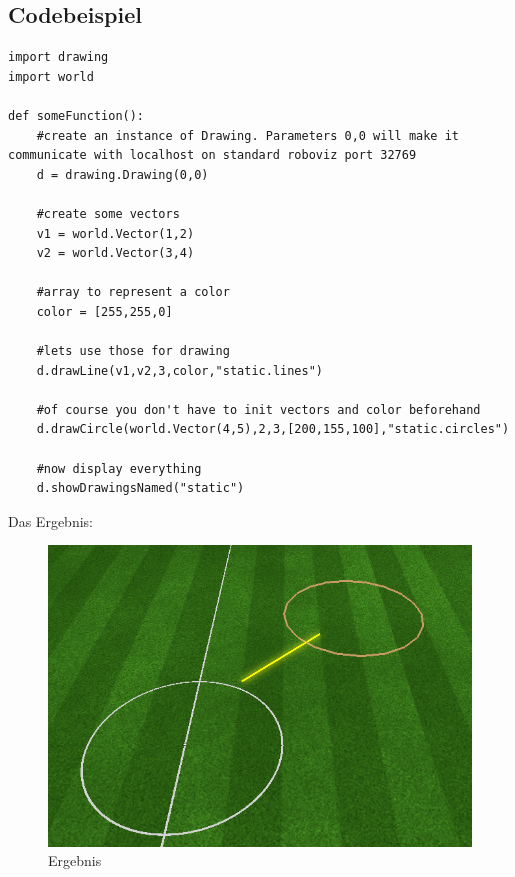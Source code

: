 \subsection*{Codebeispiel}
\begin{verbatim}import drawing
import world

def someFunction():
    #create an instance of Drawing. Parameters 0,0 will make it communicate with localhost on standard roboviz port 32769
    d = drawing.Drawing(0,0)

    #create some vectors
    v1 = world.Vector(1,2)
    v2 = world.Vector(3,4)
    
    #array to represent a color
    color = [255,255,0]

    #lets use those for drawing
    d.drawLine(v1,v2,3,color,"static.lines")

    #of course you don't have to init vectors and color beforehand
    d.drawCircle(world.Vector(4,5),2,3,[200,155,100],"static.circles")

    #now display everything
    d.showDrawingsNamed("static")
\end{verbatim}
Das Ergebnis:\\
\begin{figure}[h]
\begin{center}
\includegraphics[scale=0.5]{CodeBeispielDraw} 
\end{center}
\caption{Ergebnis}
\end{figure}\\
